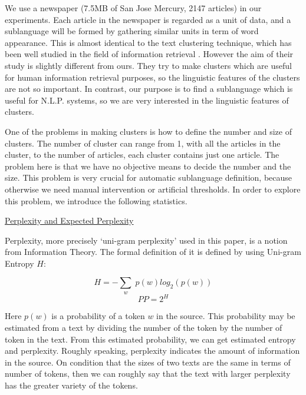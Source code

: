 We use a newspaper (7.5MB of San Jose Mercury, 2147 articles) in our experiments.
Each article in the newspaper is regarded as a unit of data, and
a sublanguage will be formed by gathering similar units in term of word appearance.
This is almost identical to the text clustering technique,
which has been well studied in the field of information retrieval 
\cite{Willett:88}.
However the aim of their study is slightly different from ours.
They try to make clusters which are useful for human information retrieval purposes,
so the linguistic features of the clusters are not so important.
In contrast, our purpose is to find a sublanguage which
is useful for N.L.P. systems, so we are very interested 
in the linguistic features of clusters.

One of the problems in making clusters is how to define the number and size of clusters.
The number of cluster can range from 1, with all the articles in the cluster, 
to the number of articles, each cluster contains just one article.
The problem here is that we have no objective means to decide the number and the size.
This problem is very crucial for automatic sublanguage definition,
because otherwise we need manual intervention or artificial thresholds.
In order to explore this problem, we introduce the following statistics. \\

\begin{flushleft}
\underline{Perplexity and Expected Perplexity} \\
\end{flushleft}

Perplexity, more precisely `uni-gram perplexity' used in this paper, is 
a notion from Information Theory.
The formal definition of it is defined by using Uni-gram Entropy $H$:

\begin{equation}
	H = - \sum_{w} \; p(w) log_{2}(p(w))
\end{equation}
\begin{equation}
	PP = 2^{H}
\end{equation}

Here $p(w)$ is a probability of a token $w$ in the source.
This probability may be estimated from a text 
by dividing the number of the token by the number of token in the text.
From this estimated probability, we can get estimated entropy and perplexity.
Roughly speaking, perplexity indicates the amount of information in the source.
On condition that the sizes of two texts are the same in terms of number of tokens,
then we can roughly say that the text with larger perplexity has 
the greater variety of the tokens.

